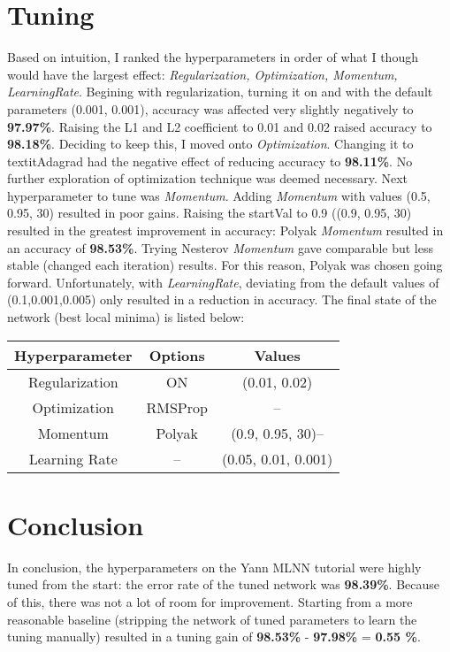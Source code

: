 \documentclass[conference,compsoc]{IEEEtran}
\begin{document}
\section{Tuning}
%
Based on intuition, I ranked the hyperparameters in order of what I though would have the largest effect:
\textit{Regularization, Optimization, Momentum, LearningRate}. Begining with regularization, turning it on and with the default parameters (0.001, 0.001), accuracy was affected very slightly negatively to \textbf{97.97\%}. Raising the L1 and L2 coefficient to 0.01 and 0.02 raised accuracy to \textbf{98.18\%}. Deciding to keep this, I moved onto \textit{Optimization}. Changing it to textit{Adagrad} had the negative effect of reducing accuracy to \textbf{98.11\%}. No further exploration of optimization technique was deemed necessary. Next hyperparameter to tune was \textit{Momentum}. Adding \textit{Momentum} with values (0.5, 0.95, 30) resulted in poor gains. Raising the startVal to 0.9 ((0.9, 0.95, 30) resulted in the greatest improvement in accuracy: Polyak \textit{Momentum} resulted in an accuracy of \textbf{98.53\%}. Trying Nesterov \textit{Momentum} gave comparable but less stable (changed each iteration) results. For this reason, Polyak was chosen going forward. Unfortunately, with \textit{LearningRate}, deviating from the default values of (0.1,0.001,0.005) only resulted in a reduction in accuracy. The final state of the network (best local minima) is listed below: 
\\
 \renewcommand{\arraystretch}{1.1}
 \begin{center}
   \begin{tabular}{ | c | c | c | }
     \hline
     \textbf{Hyperparameter} & \textbf{Options} & \textbf{Values} \\ \hline
     Regularization & ON & (0.01, 0.02) \\ \hline
     Optimization & RMSProp & -- \\ \hline
     Momentum &  Polyak &  (0.9, 0.95, 30)-- \\ \hline
     Learning Rate & -- & (0.05, 0.01, 0.001)  \\ \hline
   \end{tabular}
 \end{center}


\section{Conclusion}
%
In conclusion, the hyperparameters on the Yann MLNN tutorial were highly tuned from the start: the error rate of the tuned network was \textbf{98.39\%}. Because of this, there was not a lot of room for improvement. Starting from a more reasonable baseline (stripping the network of tuned parameters to learn the tuning manually) resulted in a tuning gain of \textbf{98.53\%} - \textbf{97.98\%} = \textbf{0.55 \%}. 



\end{document}
